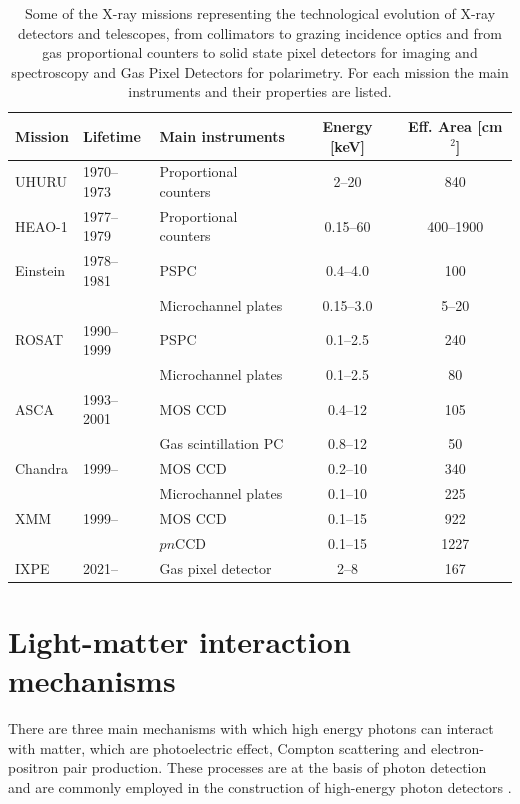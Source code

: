 \begin{table}[h]
\centering
\small
\begin{tabularx}{\textwidth}{l l X c c}
Mission & Lifetime & Main instruments & Energy [keV] & Eff. Area [cm$^2$] \\
\toprule
UHURU 	 & 1970--1973   & Proportional counters & 2--20 & 840 \\
\addlinespace
HEAO-1 & 1977--1979   & Proportional counters & 0.15--60 & 400--1900 \\
\addlinespace
Einstein & 1978--1981   & PSPC & 0.4--4.0 & 100 \\
         &              & Microchannel plates & 0.15--3.0 & 5--20 \\
\addlinespace
ROSAT	 & 1990--1999   & PSPC & 0.1--2.5 	& 240 \\
         &              & Microchannel plates & 0.1--2.5 & 80 \\
\addlinespace
ASCA 	 & 1993--2001   & MOS CCD	& 0.4--12 & 105 \\
		 &				& Gas scintillation PC & 0.8--12 & 50 \\
\addlinespace
Chandra	 & 1999-- 		& MOS CCD & 0.2--10 & 340 \\
		 & 				& Microchannel plates & 0.1--10 & 225 \\
\addlinespace
XMM 		 & 1999-- 		& MOS CCD & 0.1--15 & 922 \\
		 & 				& $pn$CCD & 0.1--15 & 1227 \\
\addlinespace
IXPE		 & 2021-- 		& Gas pixel detector	  & 2--8	  & 167 	  \\

\bottomrule
\end{tabularx}
\caption{Some of the X-ray missions representing the technological evolution of X-ray detectors and telescopes, from collimators to grazing incidence optics and from gas proportional counters to solid state pixel detectors for imaging and spectroscopy and Gas Pixel Detectors for polarimetry. For each mission the main instruments and their properties are listed.}
\label{tab:missions}
\end{table}


\section{Light-matter interaction mechanisms}
There are three main mechanisms with which high energy photons can interact with matter, which are photoelectric effect, Compton scattering and electron-positron pair production. These processes are at the basis of photon detection and are commonly employed in the construction of high-energy photon detectors \cite{longair1992, leo1994}.

